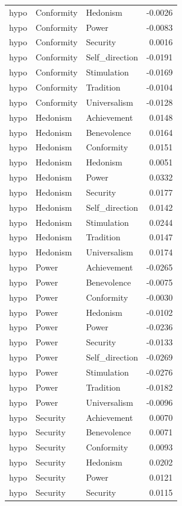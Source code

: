 \begin{tabular}{lllr}
hypo & Conformity & Hedonism & -0.0026 \\
hypo & Conformity & Power & -0.0083 \\
hypo & Conformity & Security & 0.0016 \\
hypo & Conformity & Self\_direction & -0.0191 \\
hypo & Conformity & Stimulation & -0.0169 \\
hypo & Conformity & Tradition & -0.0104 \\
hypo & Conformity & Universalism & -0.0128 \\
hypo & Hedonism & Achievement & 0.0148 \\
hypo & Hedonism & Benevolence & 0.0164 \\
hypo & Hedonism & Conformity & 0.0151 \\
hypo & Hedonism & Hedonism & 0.0051 \\
hypo & Hedonism & Power & 0.0332 \\
hypo & Hedonism & Security & 0.0177 \\
hypo & Hedonism & Self\_direction & 0.0142 \\
hypo & Hedonism & Stimulation & 0.0244 \\
hypo & Hedonism & Tradition & 0.0147 \\
hypo & Hedonism & Universalism & 0.0174 \\
hypo & Power & Achievement & -0.0265 \\
hypo & Power & Benevolence & -0.0075 \\
hypo & Power & Conformity & -0.0030 \\
hypo & Power & Hedonism & -0.0102 \\
hypo & Power & Power & -0.0236 \\
hypo & Power & Security & -0.0133 \\
hypo & Power & Self\_direction & -0.0269 \\
hypo & Power & Stimulation & -0.0276 \\
hypo & Power & Tradition & -0.0182 \\
hypo & Power & Universalism & -0.0096 \\
hypo & Security & Achievement & 0.0070 \\
hypo & Security & Benevolence & 0.0071 \\
hypo & Security & Conformity & 0.0093 \\
hypo & Security & Hedonism & 0.0202 \\
hypo & Security & Power & 0.0121 \\
hypo & Security & Security & 0.0115 \\

\end{tabular}
